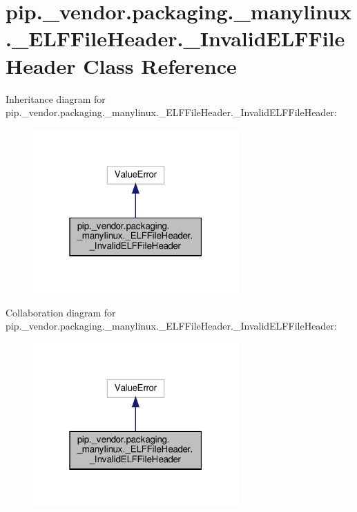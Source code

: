 \hypertarget{classpip_1_1__vendor_1_1packaging_1_1__manylinux_1_1__ELFFileHeader_1_1__InvalidELFFileHeader}{}\section{pip.\+\_\+vendor.\+packaging.\+\_\+manylinux.\+\_\+\+E\+L\+F\+File\+Header.\+\_\+\+Invalid\+E\+L\+F\+File\+Header Class Reference}
\label{classpip_1_1__vendor_1_1packaging_1_1__manylinux_1_1__ELFFileHeader_1_1__InvalidELFFileHeader}


Inheritance diagram for pip.\+\_\+vendor.\+packaging.\+\_\+manylinux.\+\_\+\+E\+L\+F\+File\+Header.\+\_\+\+Invalid\+E\+L\+F\+File\+Header\+:
\nopagebreak
\begin{figure}[H]
\begin{center}
\leavevmode
\includegraphics[width=223pt]{classpip_1_1__vendor_1_1packaging_1_1__manylinux_1_1__ELFFileHeader_1_1__InvalidELFFileHeader__inherit__graph}
\end{center}
\end{figure}


Collaboration diagram for pip.\+\_\+vendor.\+packaging.\+\_\+manylinux.\+\_\+\+E\+L\+F\+File\+Header.\+\_\+\+Invalid\+E\+L\+F\+File\+Header\+:
\nopagebreak
\begin{figure}[H]
\begin{center}
\leavevmode
\includegraphics[width=223pt]{classpip_1_1__vendor_1_1packaging_1_1__manylinux_1_1__ELFFileHeader_1_1__InvalidELFFileHeader__coll__graph}
\end{center}
\end{figure}


